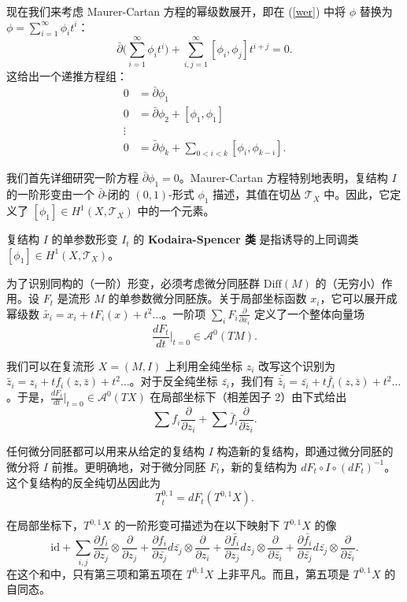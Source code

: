 现在我们来考虑 Maurer-Cartan 方程的幂级数展开，即在 (\ref{wer}) 中将 $\phi$ 替换为 $\phi=\sum_{i=1}^{\infty}\phi_i t^i$：\[
    \bar{\partial}\bigg(\sum_{i=1}^{\infty}\phi_i t^i\bigg)+\sum_{i,j=1}^{\infty}[\phi_i,\phi_j]t^{i+j}=0.
\]这给出一个递推方程组：\begin{align*}
    0&=\bar{\partial}\phi_1\\
    0&=\bar{\partial}\phi_2+[\phi_1,\phi_1]\\
    \vdots& \\
    0&=\bar{\partial}\phi_k +\sum_{0<i<k}[\phi_i,\phi_{k-i}].
\end{align*}

我们首先详细研究一阶方程 $\bar{\partial}\phi_1=0$。Maurer-Cartan 方程特别地表明，复结构 $I$ 的一阶形变由一个 $\bar{\partial}$-闭的 $(0,1)$-形式 $\phi_1$ 描述，其值在切丛 $\mathcal{T}_X$ 中。因此，它定义了 $[\phi_1]\in H^1(X,\mathcal{T}_X)$ 中的一个元素。

\begin{definition}
    复结构 $I$ 的单参数形变 $I_t$ 的 \textbf{Kodaira-Spencer 类} 是指诱导的上同调类 $[\phi_1]\in H^1(X,\mathcal{T}_X)$。
\end{definition}

为了识别同构的（一阶）形变，必须考虑微分同胚群 $\mathrm{Diff}(M)$ 的（无穷小）作用。设 $F_t$ 是流形 $M$ 的单参数微分同胚族。关于局部坐标函数 $x_i$，它可以展开成幂级数 $\tilde{x_i}=x_i+tF_i (x)+t^2\dots$。一阶项 $\sum_i F_i \frac{\partial}{\partial x_i}$ 定义了一个整体向量场\[
    \frac{dF_t}{dt}|_{t=0}\in \mathcal{A}^0(TM).
\]

我们可以在复流形 $X=(M,I)$ 上利用全纯坐标 $z_i$ 改写这个识别为 $\tilde{z_i}=z_i+tf_i(z,\bar{z})+t^2\dots$。对于反全纯坐标 $\bar{z_i}$，我们有 $\bar{\tilde{z_i}}=\bar{z_i}+t\bar{f_i}(z,\bar{z})+t^2\dots$。于是，$\frac{dF_t}{dt}|_{t=0}\in\mathcal{A}^0(TX)$ 在局部坐标下（相差因子 2）由下式给出\[
    \sum f_i\frac{\partial}{\partial z_i}+\sum \bar{f}_i\frac{\partial}{\partial\bar{z}_i}.
\]

任何微分同胚都可以用来从给定的复结构 $I$ 构造新的复结构，即通过微分同胚的微分将 $I$ 前推。更明确地，对于微分同胚 $F_t$，新的复结构为 $dF_t\circ I\circ {(dF_{t})}^{-1}$。这个复结构的反全纯切丛因此为\[
    T^{0,1}_t=dF_t(T^{0,1}X).
\]

在局部坐标下，$T^{0,1}X$ 的一阶形变可描述为在以下映射下 $T^{0,1}X$ 的像\[
    \mathrm{id}+\sum_{i,j}\frac{\partial f_i}{\partial z_j}\otimes\frac{\partial}{\partial z_j}+\frac{\partial f_i}{\partial\bar{z_j}}d\bar{z_j}\otimes\frac{\partial}{\partial z_i}+\frac{\partial \bar{f_i}}{\partial z_j}dz_j\otimes\frac{\partial}{\partial \bar{z_i}}+\frac{\partial\bar{f_i}}{\partial\bar{z_j}}d\bar{z_j}\otimes\frac{\partial}{\partial \bar{z_i}}.
\]在这个和中，只有第三项和第五项在 $T^{0,1}X$ 上非平凡。而且，第五项是 $T^{0,1}X$ 的自同态。

